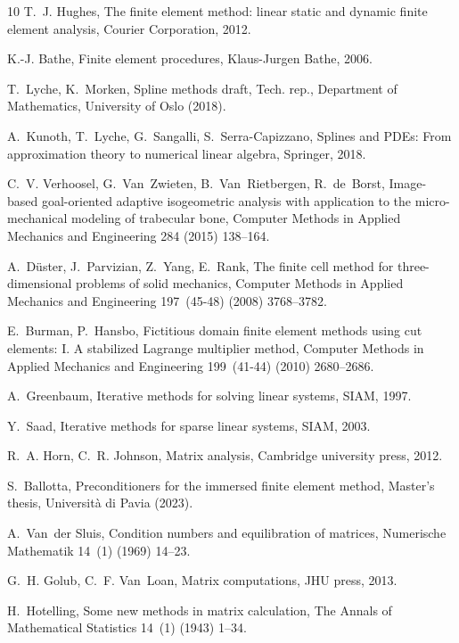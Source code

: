\documentclass{article}
\numberwithin{equation}{section}
\theoremstyle{definition}
\begin{document}
\begin{thebibliography}{10}
T.~J. Hughes, The finite element method: linear static and dynamic finite element analysis, Courier Corporation, 2012.

K.-J. Bathe, Finite element procedures, Klaus-Jurgen Bathe, 2006.

T.~Lyche, K.~Morken, Spline methods draft, Tech. rep., Department of Mathematics, University of Oslo (2018).

A.~Kunoth, T.~Lyche, G.~Sangalli, S.~Serra-Capizzano, Splines and {PDEs}: From approximation theory to numerical linear algebra, Springer, 2018.

C.~V. Verhoosel, G.~Van~Zwieten, B.~Van~Rietbergen, R.~de~Borst, Image-based goal-oriented adaptive isogeometric analysis with application to the micro-mechanical modeling of trabecular bone, Computer Methods in Applied Mechanics and Engineering 284 (2015) 138--164.

A.~D{\"u}ster, J.~Parvizian, Z.~Yang, E.~Rank, The finite cell method for three-dimensional problems of solid mechanics, Computer Methods in Applied Mechanics and Engineering 197~(45-48) (2008) 3768--3782.

E.~Burman, P.~Hansbo, Fictitious domain finite element methods using cut elements: {I}. {A} stabilized {Lagrange} multiplier method, Computer Methods in Applied Mechanics and Engineering 199~(41-44) (2010) 2680--2686.

A.~Greenbaum, Iterative methods for solving linear systems, SIAM, 1997.

Y.~Saad, Iterative methods for sparse linear systems, SIAM, 2003.

R.~A. Horn, C.~R. Johnson, Matrix analysis, Cambridge university press, 2012.

S.~Ballotta, Preconditioners for the immersed finite element method, Master's thesis, Universit{\`a} di Pavia (2023).

A.~Van~der Sluis, Condition numbers and equilibration of matrices, Numerische Mathematik 14~(1) (1969) 14--23.

G.~H. Golub, C.~F. Van~Loan, Matrix computations, JHU press, 2013.

H.~Hotelling, Some new methods in matrix calculation, The Annals of Mathematical Statistics 14~(1) (1943) 1--34.


\end{thebibliography}
\end{document}
